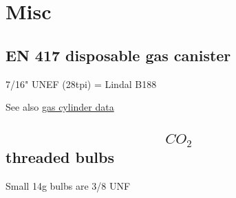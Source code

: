 \section{Misc}
\subsection{EN 417 disposable gas canister}\label{gas_cylinder_threads}
7/16" UNEF (28tpi) = Lindal B188 

See also \hyperref[gas_cylinders]{gas cylinder data}

\subsection{$$CO_2$$ threaded bulbs}
Small 14g bulbs are 3/8 UNF

\clearpage

\clearpage
